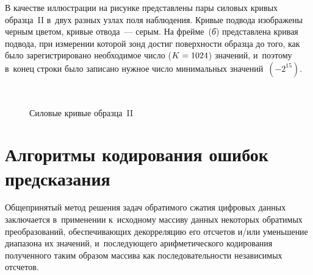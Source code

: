\begin{multicols}{2}
{}


В качестве иллюстрации на рисунке представлены пары силовых кривых образца~II 
в~двух разных узлах поля наблюдения. Кривые подвода изображены черным цветом, 
кривые отвода~--- серым. На фрейме~(\textit{б}) 
представлена кривая подвода, при измерении которой зонд достиг поверхности образца до того, 
как было зарегистрировано необходимое число ($K\hm=1024$) значений, и~поэтому в~конец строки 
было записано нужное число минимальных значений~$(-2^{15})$.

\begin{figure*}
  \vspace*{1pt}
  \begin{center}
    \mbox{%
 \epsfxsize=161.251mm 
 }


\vspace*{6pt}

{\small Силовые кривые образца~II}
\end{center}
\end{figure*} 


\section{Алгоритмы кодирования ошибок предсказания}

Общепринятый метод решения задач обратимого сжатия цифровых данных заключается в~применении к~исходному 
массиву данных некоторых обратимых преобразований, обеспечивающих декорреляцию его 
отсчетов и/или уменьшение диапазона их значений, и~последующего арифметического кодирования~\cite{b3} 
полученного таким образом массива как последовательности независимых отсчетов.


\end{multicols}
